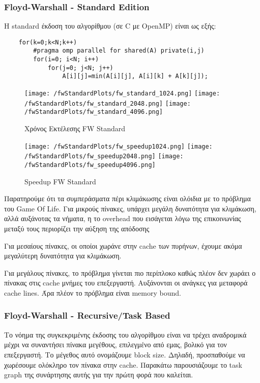 \documentclass[letterpaper,12pt]{article}
\begin{document}
\subsubsection{Floyd-Warshall - Standard Edition}
Η standard έκδοση του αλγορίθμου (σε C με OpenMP) είναι ως εξής:

\begin{lstlisting}
    for(k=0;k<N;k++)
        #pragma omp parallel for shared(A) private(i,j)
        for(i=0; i<N; i++)
            for(j=0; j<N; j++)
                A[i][j]=min(A[i][j], A[i][k] + A[k][j]);
\end{lstlisting}

\begin{figure}[H]
    \centering
    \texttt{[image: /fwStandardPlots/fw\_standard\_1024.png]}
    \texttt{[image: /fwStandardPlots/fw\_standard\_2048.png]}
    \texttt{[image: /fwStandardPlots/fw\_standard\_4096.png]}
    \caption{Χρόνος Εκτέλεσης FW Standard}
    \label{fig:Χρόνος Εκτέλεσης FW Standard}
\end{figure}

\begin{figure}[H]
    \centering
    \texttt{[image: /fwStandardPlots/fw\_speedup1024.png]}
    \texttt{[image: /fwStandardPlots/fw\_speedup2048.png]}
    \texttt{[image: /fwStandardPlots/fw\_speedup4096.png]}
    \caption{Speedup FW Standard}
    \label{fig:Speedup FW Standard}
\end{figure}

Παρατηρούμε ότι τα συμπεράσματα πέρι κλιμάκωσης είναι ολόιδια με το πρόβλημα του Game Of Life.
Για μικρούς πίνακες, υπάρχει μεγάλη δυνατότητα για κλιμάκωση, αλλά αυξάνοτας τα νήματα, η το overhead
που εισάγεται λόγω της επικοινωνίας μεταξύ τους περιορίζει την αύξηση της απόδοσης

Για μεσαίους πίνακες, οι οποίοι χωράνε στην cache των πυρήνων, έχουμε ακόμα μεγαλύτερη δυνατότητα για κλιμάκωση.

Για μεγάλους πίνακες, το πρόβλημα γίνεται πιο περίπλοκο καθώς πλέον δεν χωράει ο πίνακας στις cache μνήμες του επεξεργαστή.
Αυξάνονται οι ανάγκες για μεταφορά cache lines. Άρα πλέον το πρόβλημα είναι memory bound. 

\subsubsection{Floyd-Warshall - Recursive/Task Based}

Το νόημα της συγκεκριμένης έκδοσης του αλγορίθμου είναι να τρέχει αναδρομικά μέχρι να συναντήσει πίνακα
μεγέθους, επιλεγμένο από εμας, βολικό για τον επεξεργαστή. Το μέγεθος αυτό ονομάζουμε block size. Δηλαδή, προσπαθούμε να χωρέσουμε ολόκληρο τον
πίνακα στην cache. Παρακάτω παρουσιάζουμε το task graph της συνάρτησης αυτής για την πρώτη φορά που καλείται.
\end{document}
